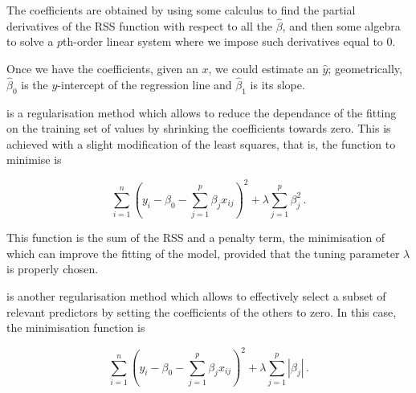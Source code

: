 \documentclass[../main.tex]{subfiles}
\begin{document}
The coefficients are obtained by using some calculus to find the partial 
derivatives of the RSS function with respect to all the $\hat{\beta}$, 
and then some algebra to solve a $p$th-order linear system where we 
impose such derivatives equal to $0$.

Once we have the coefficients, given an $x$, we could estimate an 
$\hat{y}$; geometrically, $\hat{\beta}_0$ is the $y$-intercept of the 
regression line and $\hat{\beta}_1$ is its slope.

 is a regularisation method 
which allows to reduce the dependance of the fitting on the training set 
of values by shrinking the coefficients towards zero. This is achieved 
with a slight modification of the least squares, that is, the function 
to minimise is

\begin{equation}
	\sum_{i=1}^{n}\left(y_i-\beta_0-\sum_{j=1}^{p}\beta_jx_{ij}\right)^2+
		\lambda\sum_{j=1}^{p}\beta_j^2\,.
\end{equation}

This function is the sum of the RSS and a penalty term, the minimisation 
of which can improve the fitting of the model, provided that the tuning 
parameter $\lambda$ is properly chosen.

 is another regularisation 
method which allows to effectively select a subset of relevant 
predictors by setting the coefficients of the others to zero. In this 
case, the minimisation function is

\begin{equation}
	\sum_{i=1}^{n}\left(y_i-\beta_0-\sum_{j=1}^{p}\beta_jx_{ij}\right)^2+
		\lambda\sum_{j=1}^{p}\left|\beta_j\right|\,.
\end{equation}
\end{document}
